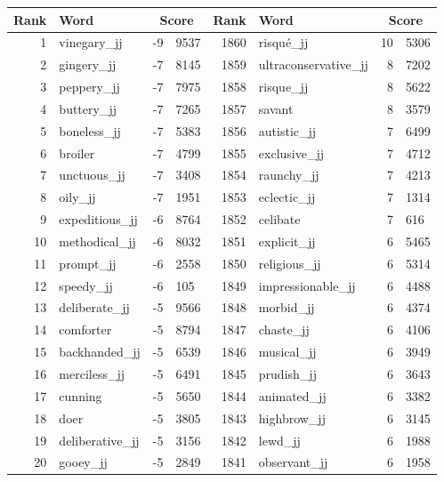 \begin{table}[tbp]
    \begin{tabular}{| rlr@{.}l | rlr@{.}l |}
    \hline
    \textbf{Rank} & \textbf{Word} & \multicolumn{2}{c|}{\textbf{Score}} & \textbf{Rank} & \textbf{Word} & \multicolumn{2}{c|}{\textbf{Score}} \\
    \hline
    1 & vinegary\_jj & -9 & 9537    &    1860 & risqué\_jj & 10 & 5306 \\
    2 & gingery\_jj & -7 & 8145    &    1859 & ultraconservative\_jj & 8 & 7202 \\
    3 & peppery\_jj & -7 & 7975    &    1858 & risque\_jj & 8 & 5622 \\
    4 & buttery\_jj & -7 & 7265    &    1857 & savant & 8 & 3579 \\
    5 & boneless\_jj & -7 & 5383    &    1856 & autistic\_jj & 7 & 6499 \\
    6 & broiler & -7 & 4799    &    1855 & exclusive\_jj & 7 & 4712 \\
    7 & unctuous\_jj & -7 & 3408    &    1854 & raunchy\_jj & 7 & 4213 \\
    8 & oily\_jj & -7 & 1951    &    1853 & eclectic\_jj & 7 & 1314 \\
    9 & expeditious\_jj & -6 & 8764    &    1852 & celibate & 7 & 616 \\
    10 & methodical\_jj & -6 & 8032    &    1851 & explicit\_jj & 6 & 5465 \\
    11 & prompt\_jj & -6 & 2558    &    1850 & religious\_jj & 6 & 5314 \\
    12 & speedy\_jj & -6 & 105    &    1849 & impressionable\_jj & 6 & 4488 \\
    13 & deliberate\_jj & -5 & 9566    &    1848 & morbid\_jj & 6 & 4374 \\
    14 & comforter & -5 & 8794    &    1847 & chaste\_jj & 6 & 4106 \\
    15 & backhanded\_jj & -5 & 6539    &    1846 & musical\_jj & 6 & 3949 \\
    16 & merciless\_jj & -5 & 6491    &    1845 & prudish\_jj & 6 & 3643 \\
    17 & cunning & -5 & 5650    &    1844 & animated\_jj & 6 & 3382 \\
    18 & doer & -5 & 3805    &    1843 & highbrow\_jj & 6 & 3145 \\
    19 & deliberative\_jj & -5 & 3156    &    1842 & lewd\_jj & 6 & 1988 \\
    20 & gooey\_jj & -5 & 2849    &    1841 & observant\_jj & 6 & 1958 \\

\end{tabular}
\end{table}
